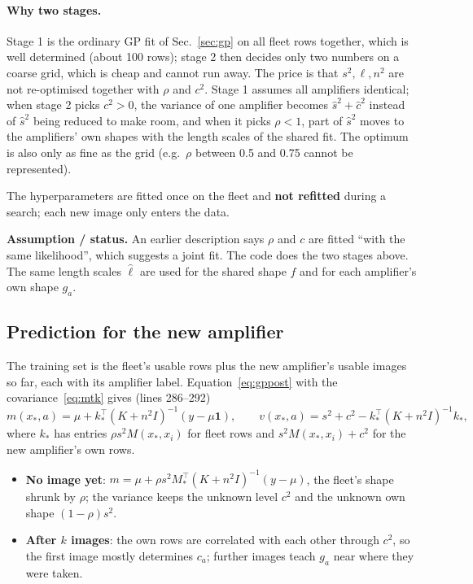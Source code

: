 \documentclass[10pt,a4paper]{article}
\newcommand{\one}{\mathbf 1}
\newcommand{\caveat}[1]{\par\smallskip\noindent\colorbox{orange!10}{\parbox{\dimexpr\linewidth-2\fboxsep}{\small\textbf{Assumption / status.} #1}}\par\smallskip}
\begin{document}
\paragraph{Why two stages.} Stage 1 is the ordinary GP fit of Sec.~\ref{sec:gp} on all fleet rows together, which is well determined
(about 100 rows); stage 2 then decides only two numbers on a coarse grid, which is cheap and cannot run away. The price is that
$s^2,\ell,n^2$ are not re-optimised together with $\rho$ and $c^2$. Stage 1 assumes all amplifiers identical; when stage 2 picks
$c^2>0$, the variance of one amplifier becomes $\hat s^2+\hat c^2$ instead of $\hat s^2$ being reduced to make room, and when it picks
$\rho<1$, part of $\hat s^2$ moves to the amplifiers' own shapes with the length scales of the shared fit. The optimum is also only as
fine as the grid (e.g.\ $\rho$ between 0.5 and 0.75 cannot be represented).

The hyperparameters are fitted once on the fleet and \textbf{not refitted} during a search; each new image only enters the data.

\caveat{An earlier description says $\rho$ and $c$ are fitted ``with the same likelihood'', which suggests a joint fit. The
code does the two stages above. The same length scales $\hat\ell$ are used for the shared shape $f$ and for each amplifier's own
shape $g_a$.}

\subsection{Prediction for the new amplifier}
The training set is the fleet's usable rows plus the new amplifier's usable images so far, each with its amplifier label.
Equation~\eqref{eq:gppost} with the covariance~\eqref{eq:mtk} gives (lines 286--292)
\begin{equation}
m(x_*,a)=\mu+k_*^\top(K+n^2I)^{-1}(y-\mu\one),\qquad
v(x_*,a)=s^2+c^2-k_*^\top(K+n^2I)^{-1}k_*,
\end{equation}
where $k_*$ has entries $\rho s^2M(x_*,x_i)$ for fleet rows and $s^2M(x_*,x_i)+c^2$ for the new amplifier's own rows.
\begin{itemize}
\item \textbf{No image yet}: $m=\mu+\rho s^2M_*^\top(K+n^2I)^{-1}(y-\mu)$, the fleet's shape shrunk by $\rho$;
  the variance keeps the unknown level $c^2$ and the unknown own shape $(1-\rho)s^2$.
\item \textbf{After $k$ images}: the own rows are correlated with each other through $c^2$, so the first image mostly
  determines $c_a$; further images teach $g_a$ near where they were taken.
\end{itemize}
\end{document}
